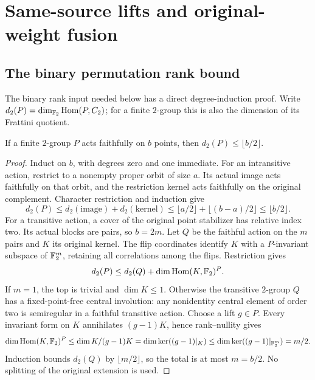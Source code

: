 \section{Same-source lifts and original-weight fusion}\label{sec:fusion}
\subsection{The binary permutation rank bound}
The binary rank input needed below has a direct degree-induction proof.
Write $d_2(P)=\dim_{\mathbb F_2}\operatorname{Hom}(P,C_2)$; for a finite $2$-group this
is also the dimension of its Frattini quotient.
\begin{lemma}\label{lem:binary-permutation-rank}
If a finite $2$-group $P$ acts faithfully on $b$ points, then
$d_2(P)\leq\lfloor b/2\rfloor$.
\end{lemma}
\begin{proof}
Induct on $b$, with degrees zero and one immediate. For an intransitive
action, restrict to a nonempty proper orbit of size $a$. Its actual image
acts faithfully on that orbit, and the restriction kernel acts faithfully
on the original complement. Character restriction and induction give
\[
 d_2(P)\leq d_2(\text{image})+d_2(\text{kernel})
 \leq\lfloor a/2\rfloor+\lfloor(b-a)/2\rfloor
 \leq\lfloor b/2\rfloor.
\]
For a transitive action, a cover of the original point stabilizer has
relative index two. Its actual blocks are pairs, so $b=2m$. Let $Q$
be the faithful action on the $m$ pairs and $K$ its original kernel.
The flip coordinates identify $K$ with a $P$-invariant subspace of
$\mathbb F_2^m$, retaining all correlations among the flips. Restriction gives
\[
 d_2(P)\leq d_2(Q)+\dim\operatorname{Hom}(K,\mathbb F_2)^P.
\]
If $m=1$, the top is trivial and $\dim K\leq1$. Otherwise the
transitive $2$-group $Q$ has a fixed-point-free central involution:
any nonidentity central element of order two is semiregular in a
faithful transitive action. Choose a lift $g\in P$. Every invariant
form on $K$ annihilates $(g-1)K$, hence rank--nullity gives
\[
 \dim\operatorname{Hom}(K,\mathbb F_2)^P
 \leq\dim K/(g-1)K
 =\dim\ker((g-1)|_K)
 \leq\dim\ker((g-1)|_{\mathbb F_2^m})=m/2.
\]
Induction bounds $d_2(Q)$ by $\lfloor m/2\rfloor$, so the total
is at most $m=b/2$. No splitting of the original extension is used.
\end{proof}

